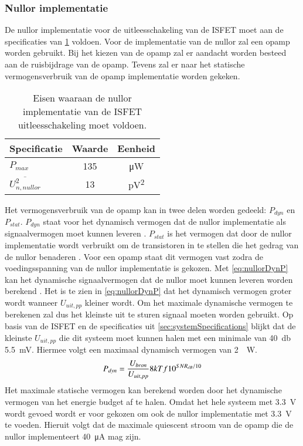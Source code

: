 \subsubsection{Nullor implementatie}
De nullor implementatie voor de uitleesschakeling van de ISFET moet aan de specificaties van \cref{tab:nullorImplementSpecs} voldoen. Voor de implementatie van de nullor zal een opamp worden gebruikt. Bij het kiezen van de opamp zal er aandacht worden besteed aan de ruisbijdrage van de opamp. Tevens zal er naar het statische vermogensverbruik van de opamp implementatie worden gekeken.
\begin{table}[!htbp]
    \centering
    \begin{tabular}{l|c|c}
        Specificatie & Waarde & Eenheid \\\hline
        $P_{max}$ & 135 & \si{\micro\watt}\\
        $\overline{U_{n,nullor}^2}$ & 13 & \si{\pico\volt^2}
    \end{tabular}
    \caption{Eisen waaraan de nullor implementatie van de ISFET uitleesschakeling moet voldoen.}
    \label{tab:nullorImplementSpecs}
\end{table}

Het vermogensverbruik van de opamp kan in twee delen worden gedeeld: $P_{dyn}$ en $P_{stat}$. $P_{dyn}$ staat voor het dynamisch vermogen dat de nullor implementatie als signaalvermogen moet kunnen leveren \cite{energieZuinigeSystemenOntwerpen}. $P_{stat}$ is het vermogen dat door de nullor implementatie wordt verbruikt om de transistoren in te stellen die het gedrag van de nullor benaderen \cite{energieZuinigeSystemenOntwerpen}. Voor een opamp staat dit vermogen vast zodra de voedingsspanning van de nullor implementatie is gekozen. Met \cref{eq:nullorDynP} kan het dynamische signaalvermogen dat de nullor moet kunnen leveren worden berekend \cite{energieZuinigeSystemenOntwerpen}. Het is te zien in \cref{eq:nullorDynP} dat het dynamisch vermogen groter wordt wanneer $U_{uit,pp}$ kleiner wordt. Om het maximale dynamische vermogen te berekenen zal dus het kleinste uit te sturen signaal moeten worden gebruikt. Op basis van de ISFET en de specificaties uit \cref{sec:systemSpecifications} blijkt dat de kleinste $U_{uit,pp}$ die dit systeem moet kunnen halen met een minimale \SNR van \qty{40}{\decibel} \qty{5.5}{\milli\volt}. Hiermee volgt een maximaal dynamisch vermogen van \qty{2}{\pico.\watt}.
\begin{equation} \label{eq:nullorDynP}
    P_{dyn}=\frac{U_{bron}}{U_{uit,pp}}8kTf10^{SNR_{dB}/10}
    \tagaddtext{[\si{\watt}]}
\end{equation}
Het maximale statische vermogen kan berekend worden door het dynamische vermogen van het energie budget af te halen. Omdat het hele systeem met \qty{3.3}{\volt} wordt gevoed wordt er voor gekozen om ook de nullor implementatie met \qty{3.3}{\volt} te voeden. Hieruit volgt dat de maximale quiescent stroom van de opamp die de nullor implementeert \qty{40}{\micro\ampere} mag zijn.

